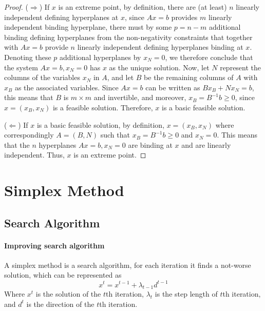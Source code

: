                    \begin{proof}
                        ($\Rightarrow$) If $x$ is an extreme point, by definition, there are (at least) $n$ linearly independent defining hyperplanes at $x$, since $Ax = b$ provides $m$ linearly independent binding hyperplane, there must by some $p = n - m$ additional binding defining hyperplanes from the non-negativity constraints that together with $Ax = b$ provide $n$ linearly independent defining hyperplanes binding at $x$. Denoting these $p$ additional hyperplanes by $x_N = 0$, we therefore conclude that the system $Ax = b, x_N = 0$ has $x$ as the unique solution. Now, let $N$ represent the columns of the variables $x_N$ in $A$, and let $B$ be the remaining columns of $A$ with $x_B$ as the associated variables. Since $Ax = b$ can be written as $Bx_B + Nx_N = b$, this means that $B$ is $m \times m$ and invertible, and moreover, $x_B = B^{-1}b \ge 0$, since $x = (x_B, x_N)$ is a feasible solution. Therefore, $x$ is a basic feasible solution.

                        ($\Leftarrow$) If $x$ is a basic feasible solution, by definition, $x = (x_B, x_N)$ where correspondingly $A = (B, N)$ such that $x_B = B^{-1}b \ge 0$ and $x_N = 0$. This means that the $n$ hyperplanes $Ax = b, x_N = 0$ are binding at $x$ and are linearly independent. Thus, $x$ is an extreme point.
                    \end{proof}

        \section{Simplex Method}
            \subsection{Search Algorithm}
                \paragraph{Improving search algorithm}
                    A simplex method is a search algorithm, for each iteration it finds a not-worse solution, which can be represented as
                    \begin{equation}
                        x^t = x^{t-1}+\lambda_{t-1}d^{t-1} \nonumber 
                    \end{equation}
                    Where $x^t$ is the solution of the $t$th iteration, $\lambda_t$ is the step length of $t$th iteration, and $d^t$ is the direction of the $t$th iteration.
                        
